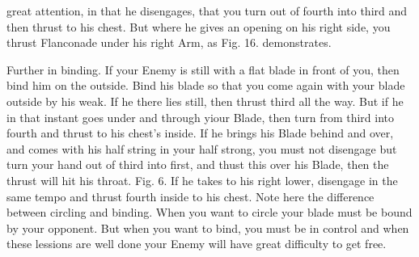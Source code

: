 \newpage


\newpage



great attention, in that he disengages, that you turn out of fourth
into third and then thrust to his chest. But where he gives an opening
on his right side, you thrust Flanconade under his right Arm, as
Fig. 16. demonstrates.

\exercise{}

Further in binding. If your Enemy is still with a flat blade in front
of you, then bind him on the outside. Bind his blade so that you come
again with your blade outside by his weak. If he there lies still,
then thrust third all the way.
But if he in that instant goes under and through yiour Blade, then
turn from third into fourth and thrust to his chest's inside. If he
brings his Blade behind and over, and comes with his half string in
your half strong, you must not disengage but turn your hand out of
third into first, and thust this over his Blade, then the thrust will
hit his throat. Fig. 6. If he takes to his right lower, disengage in
the same tempo and thrust fourth inside to his chest.
Note here the difference between circling and binding. When you want
to circle your blade must be bound by your opponent. But when you want
to bind, you must be in control and when these lessions are well done
your Enemy will have great difficulty to get free.

